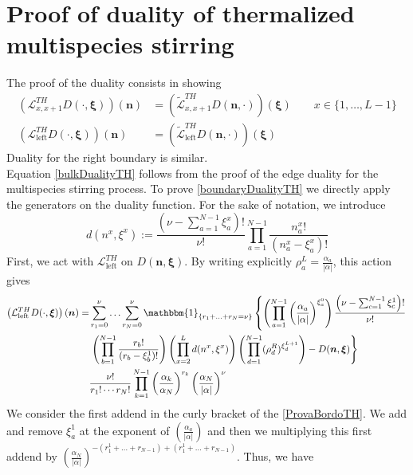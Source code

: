 \documentclass[10pt]{article}
\numberwithin{equation}{section}
\numberwithin{equation}{subsection}
\begin{document}
\section{Proof of duality of thermalized multispecies stirring}\label{appendix-dualityThermalized}
The proof of the duality consists in showing
\begin{align}
	\left(\mathcal{L}_{x,x+1}^{TH}D(\cdot,\bm{\xi})\right)(\bm{n})&=\left(\widetilde{\mathcal{L}}_{x,x+1}^{TH}D(\bm{n},\cdot)\right)(\bm{\xi})\qquad x\in \{1,\ldots,L-1\}\label{bulkDualityTH}\\
	\left(\mathcal{L}_{\text{left}}^{TH}D(\cdot,\bm{\xi})\right)(\bm{n})&=\left(\widetilde{\mathcal{L}}_{\text{left}}^{TH}D(\bm{n},\cdot)\right)(\bm{\xi})\label{boundaryDualityTH}
\end{align}
Duality for the right boundary is similar. \\
Equation \eqref{bulkDualityTH} follows from the proof of the edge duality for the multispecies stirring process. To prove \eqref{boundaryDualityTH} we directly apply the generators on the duality function. For the sake of notation, we introduce 
\begin{equation}
	d(n^{x},\xi^{x}):=\frac{(\nu-\sum_{a=1}^{N-1}\xi_{a}^{x})!}{\nu!}\prod_{a=1}^{N-1}\frac{n_{a}^{x}!}{(n_{a}^{x}-\xi_{a}^{x})!}
\end{equation}
First, we act with $\mathcal{L}_{\text{left}}^{TH}$ on $D(\bm{n},\bm{\xi})$. By writing explicitly $\rho_{a}^{L}=\frac{\alpha_{a}}{|\alpha|}$, this action gives
\begin{align}\label{ProvaBordoTH}
	\left(\mathcal{L}_{\text{left}}^{TH}D(\cdot,\bm{\xi})\right)(\bm{n})=\nonumber&\sum_{r_{1}=0}^{\nu}\ldots\sum_{r_{N}=0}^{\nu}\mathbbm{1}_{\{r_{1}+\ldots+r_{N}=\nu\}}\left\{\left(\prod_{a=1}^{N-1}\left(\frac{\alpha_{a}}{|\alpha|}\right)^{\xi_{a}^{0}}\right)\frac{\left(\nu-\sum_{c=1}^{N-1}\xi_{c}^{1}\right)!}{\nu!}\right.
	\\&\nonumber
	\left.\left(\prod_{b=1}^{N-1}\frac{r_{b}!}{(r_{b}-\xi^{1}_{b})!}\right)\left(\prod_{x=2}^{L}d(n^{x},\xi^{x})\right)\left(\prod_{d=1}^{N-1}(\rho_{d}^{R})^{\xi_{d}^{L+1}}\right)-D(\bm{n},\bm{\xi})\right\}
	\\&
	\frac{\nu!}{r_{1}!\cdots r_{N}!}\prod_{k=1}^{N-1}\left(\frac{\alpha_{k}}{\alpha_{N}}\right)^{r_{k}}\left(\frac{\alpha_{N}}{|\alpha|}\right)^{\nu}
\end{align}
We consider the first addend in the curly bracket of the \eqref{ProvaBordoTH}. We add and remove $\xi_{a}^{1}$ at the exponent of $\left(\frac{\alpha_{a}}{|\alpha|}\right)$ and then we multiplying this first addend by $\left(\frac{\alpha_{N}}{|\alpha|}\right)^{-(r_{1}^{1}+\ldots+r_{N-1})+(r_{1}^{1}+\ldots+r_{N-1})}$. Thus, we have
\end{document}
